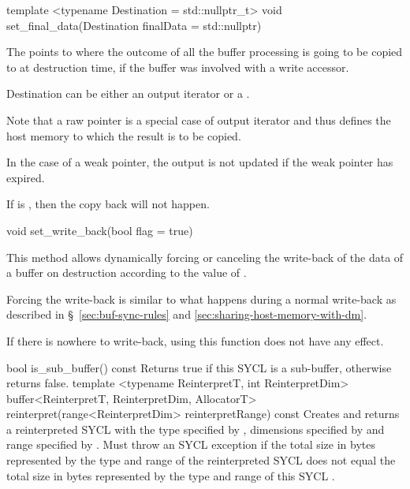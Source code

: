    \addRowTwoL
    {template <typename Destination = std::nullptr_t>}
    {void set_final_data(Destination finalData = std::nullptr)}
    {
      The  points to where the outcome of all
      the buffer processing is going to be copied to at destruction
      time, if the buffer was involved with a write accessor.

      Destination can be either an output iterator or a
      .

      Note that a raw pointer is a special case of output iterator and
      thus defines the host memory to which the result is to be
      copied.

      In the case of a weak pointer, the output is not updated if the
      weak pointer has expired.

      If  is , then
      the copy back will not happen.
    }

   \addRow
    {void set_write_back(bool flag = true)}
    {
      This method allows dynamically forcing or canceling the
      write-back of the data of a buffer on destruction according to
      the value of .

      Forcing the write-back is similar to what happens during a
      normal write-back as described in \S~\ref{sec:buf-sync-rules}
      and \ref{sec:sharing-host-memory-with-dm}.

      If there is nowhere to write-back, using this function does not
      have any effect.
    }
   \addRow
    {bool is_sub_buffer() const}
    {
      Returns true if this SYCL  is a sub-buffer, otherwise
      returns false.
    }
   \addRowThreeL
     { template <typename ReinterpretT, int ReinterpretDim> }
     { buffer<ReinterpretT, ReinterpretDim, AllocatorT> }
     { reinterpret(range<ReinterpretDim> reinterpretRange) const }
     {
       Creates and returns a reinterpreted SYCL  with the
       type specified by , dimensions specified by
        and range specified by
       . Must throw an
        SYCL exception if the total size in
       bytes represented by the type and range of the reinterpreted SYCL
        does not equal the total size in bytes represented by
       the type and range of this SYCL .
     }
\completeTable


